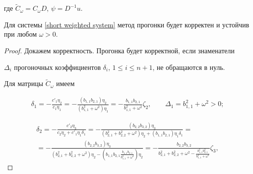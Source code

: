 где $\widetilde{C}_{\omega} = C_{\omega} D$, ${\psi} = D^{-1}u$.



\smallskip



\begin{theorem}

Для системы \eqref{short weighted system} метод прогонки будет корректен и устойчив при любом $\omega > 0.$

\end{theorem}



\begin{proof}

Докажем корректность. Прогонка будет корректной, если знаменатели

$\Delta_i$ прогоночных коэффициентов $\delta_i$, $1 \leqslant i \leqslant {n+1}$, не обращаются в нуль. 

Для матрицы $\widetilde{C}_{\omega}$ имеем

\begin{gather*}

\delta_1 = -{\frac{c'_1 \eta_2}{c_1 \eta_1}} =

-{\frac{(b_{1,1}b_{2,1}) \eta_2}{(b_{1,1}^2 + \omega^2) \eta_1}} =

-{\frac{b_{1,1}b_{2,1}}{b_{1,1}^2 + \omega^2}} \zeta_2, \qquad

\Delta_1 = b_{1,1}^2 + \omega^2 > 0;

\end{gather*}



\begin{multline*}

\delta_2 = -{\frac{c'_2 \eta_3}{c_2 \eta_2 + c'_1 \eta_1 \delta_1}}

= -{\frac{(b_{2,2}b_{3,2}) \eta_3}{(b_{2,1}^2 + b_{2,2}^2 +

\omega^2) \eta_2 + (b_{1,1}b_{2,1}) \eta_1 \delta_1}} = \\

= -{\frac{(b_{2,2}b_{3,2}) \eta_3}{(b_{2,1}^2 + b_{2,2}^2 +

\omega^2) \eta_2 - \left(b_{1,1}b_{2,1}

\frac{b_{1,1}b_{2,1}}{b_{1,1}^2 + \omega^2} \right) \eta_2}} =

-{\frac{b_{2,2}b_{3,2}}{b_{2,1}^2 + b_{2,2}^2 + \omega^2 -

{\frac{b_{1,1}^2b_{2,1}^2}{b_{1,1}^2 + \omega^2}}}}

\zeta_3, 


\end{multline*}
\end{proof}
